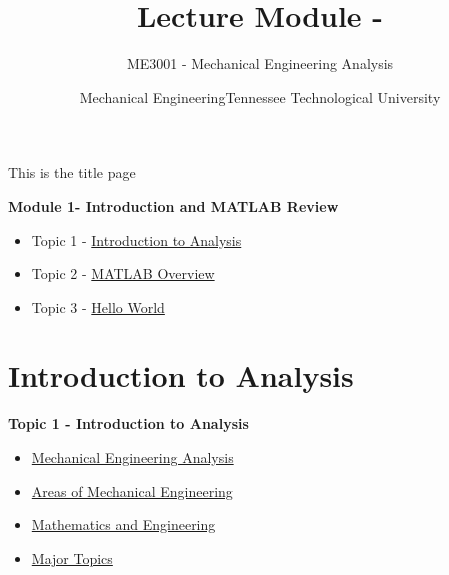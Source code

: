 \documentclass{ltx-talk} %
\author{ME3001 - Mechanical Engineering Analysis}
\title{Lecture Module - \moduletitle}
\date{Mechanical Engineering\vspc Tennessee Technological University}
\newcommand{\MNUM}{1\hspace{2mm}} %
\newcommand{\moduletitle}{Introduction and MATLAB Review}
\newcommand{\sectionItitle}{Introduction to Analysis}
\newcommand{\sectionIItitle}{MATLAB Overview}
\newcommand{\sectionIIItitle}{Hello World}
\newcommand{\sectionIsubsectionItitle}{Mechanical Engineering Analysis}
\newcommand{\sectionIsubsectionIItitle}{Areas of Mechanical Engineering}
\newcommand{\sectionIsubsectionIIItitle}{Mathematics and Engineering}
\newcommand{\sectionIsubsectionIVtitle}{Major Topics}
\begin{document}
	\lstset{language=MATLAB,basicstyle=\ttfamily\small,showstringspaces=false}

	\begin{frame}
		This is the title page
	\end{frame}
	\begin{frame} 
		\large \textbf{Module \MNUM - \moduletitle} \vspace{3mm}\\

		\begin{itemize}
			\item Topic 1 - \hyperlink{sectionI}{\sectionItitle} \vspc %
			\item Topic 2 - \hyperlink{sectionII}{\sectionIItitle} \vspc %
			\item Topic 3 - \hyperlink{sectionIII}{\sectionIIItitle} \vspc %
		\end{itemize}

	\end{frame}

	\section{\sectionItitle}\label{sectionI}

		\begin{frame} 
			\large \textbf{Topic 1 - \sectionItitle} \vspace{3mm}\\

			\begin{itemize}
				\item \hyperlink{sectionIsubsectionI}{\sectionIsubsectionItitle} \vspc %
				\item \hyperlink{sectionIsubsectionII}{\sectionIsubsectionIItitle} \vspc %
				\item \hyperlink{sectionIsubsectionIII}{\sectionIsubsectionIIItitle} \vspc %
				\item \hyperlink{sectionIsubsectionIV}{\sectionIsubsectionIVtitle} \vspc %
			\end{itemize}
		\end{frame}
		
\end{document}

